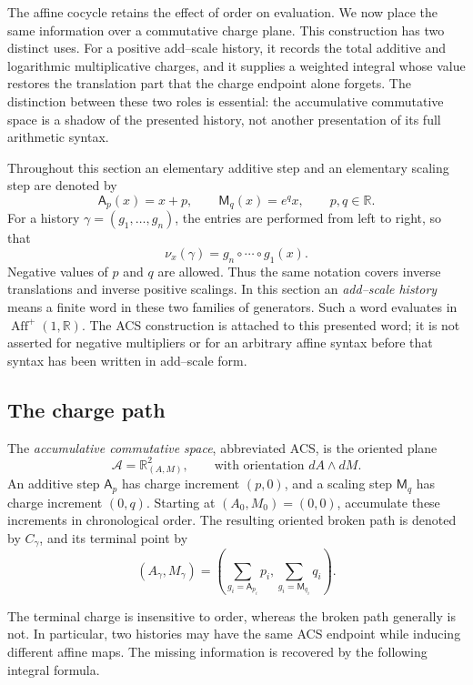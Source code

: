 The affine cocycle retains the effect of order on evaluation.  We now place the
same information over a commutative charge plane.  This construction has two
distinct uses.  For a positive add--scale history, it records the total additive and
logarithmic multiplicative charges, and it supplies a weighted integral whose value restores
the translation part that the charge endpoint alone forgets.  The distinction
between these two roles is essential: the accumulative commutative space is a
shadow of the presented history, not another presentation of its full arithmetic
syntax.

Throughout this section an elementary additive step and an elementary scaling
step are denoted by
\[
    \mathsf A_p(x)=x+p,
    \qquad
    \mathsf M_q(x)=e^q x,
    \qquad p,q\in\mathbb R.
\]
For a history \(\gamma=(g_1,\ldots,g_n)\), the entries are performed from left
to right, so that
\[
    \nu_x(\gamma)=g_n\circ\cdots\circ g_1(x).
\]
Negative values of \(p\) and \(q\) are allowed.  Thus the same notation covers
inverse translations and inverse positive scalings.
In this section an \emph{add--scale history} means a finite word in these two
families of generators.  Such a word evaluates in
\(\operatorname{Aff}^+(1,\mathbb R)\).  The ACS construction is attached to
this presented word; it is not asserted for negative multipliers or for an
arbitrary affine syntax before that syntax has been written in add--scale form.

\subsection{The charge path}

\begin{definition}
\label{def:acs}
The \emph{accumulative commutative space}, abbreviated ACS, is the oriented
plane
\[
    \mathcal A=\mathbb R^2_{(A,M)},
    \qquad \text{with orientation } dA\wedge dM.
\]
An additive step \(\mathsf A_p\) has charge increment \((p,0)\), and a scaling
step \(\mathsf M_q\) has charge increment \((0,q)\).  Starting at
\((A_0,M_0)=(0,0)\), accumulate these increments in chronological order.  The
resulting oriented broken path is denoted by \(C_\gamma\), and its terminal
point by
\[
    (A_\gamma,M_\gamma)
      =\left(\sum_{g_i=\mathsf A_{p_i}}p_i,
              \sum_{g_i=\mathsf M_{q_i}}q_i\right).
\]
\end{definition}

The terminal charge is insensitive to order, whereas the broken path generally
is not.  In particular, two histories may have the same ACS endpoint while
inducing different affine maps.  The missing information is recovered by the
following integral formula.

